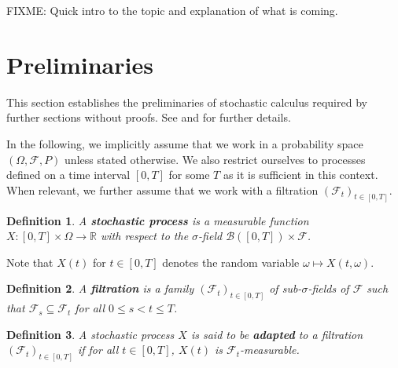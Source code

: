 \documentclass[a4paper]{article}
\newtheorem{definition}{Definition}[section]
\begin{document}
FIXME: Quick intro to the topic and explanation of what is coming.

\section{Preliminaries}


This section establishes the preliminaries of stochastic calculus required by further sections without proofs. See \textcite{capinski_stochastic_2012} and \textcite{capinski_blackscholes_2012} for further details.

In the following, we implicitly assume that we work in a probability space $(\Omega, \mathcal{F}, P)$ unless stated otherwise. We also restrict ourselves to processes defined on a time interval $[0,T]$ for some $T$ as it is sufficient in this context. When relevant, we further assume that we work with a filtration $(\mathcal{F}_t)_{t \in [0,T]}$.

\begin{definition}
  A \textbf{stochastic process} is a measurable function $X : [0,T] \times \Omega \to \mathbb{R}$ with respect to the $\sigma$-field $\mathcal{B}([0,T]) \times \mathcal{F}$.
\end{definition}

Note that $X(t)$ for $t \in [0,T]$ denotes the random variable $\omega \mapsto X(t,\omega)$.

\begin{definition}
  A \textbf{filtration} is a family $(\mathcal{F}_t)_{t \in [0,T]}$ of sub-$\sigma$-fields of $\mathcal{F}$ such that $\mathcal{F}_s \subseteq \mathcal{F}_t$ for all $0 \le s < t \le T$.
\end{definition}

\begin{definition}
  A stochastic process $X$ is said to be \textbf{adapted} to a filtration $(\mathcal{F}_t)_{t \in [0,T]}$ if for all $t \in [0,T]$, $X(t)$ is $\mathcal{F}_t$-measurable.
\end{definition}
\end{document}
